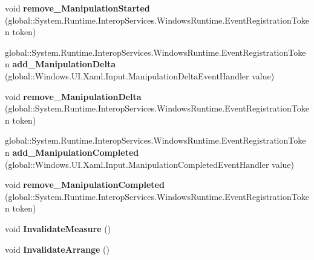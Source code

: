 \begin{DoxyCompactItemize}
void {\bfseries remove\+\_\+\+Manipulation\+Started} (global\+::\+System.\+Runtime.\+Interop\+Services.\+Windows\+Runtime.\+Event\+Registration\+Token token)
\item 
\mbox{\label{interface_windows_1_1_u_i_1_1_xaml_1_1_i_u_i_element_a478e7f65d80dfe362a865349005a2475}} 
global\+::\+System.\+Runtime.\+Interop\+Services.\+Windows\+Runtime.\+Event\+Registration\+Token {\bfseries add\+\_\+\+Manipulation\+Delta} (global\+::\+Windows.\+U\+I.\+Xaml.\+Input.\+Manipulation\+Delta\+Event\+Handler value)
\item 
\mbox{\label{interface_windows_1_1_u_i_1_1_xaml_1_1_i_u_i_element_a6abde84051b66829e30ea77484453f4f}} 
void {\bfseries remove\+\_\+\+Manipulation\+Delta} (global\+::\+System.\+Runtime.\+Interop\+Services.\+Windows\+Runtime.\+Event\+Registration\+Token token)
\item 
\mbox{\label{interface_windows_1_1_u_i_1_1_xaml_1_1_i_u_i_element_a359638bee7a6419a6b037cbd2981ae94}} 
global\+::\+System.\+Runtime.\+Interop\+Services.\+Windows\+Runtime.\+Event\+Registration\+Token {\bfseries add\+\_\+\+Manipulation\+Completed} (global\+::\+Windows.\+U\+I.\+Xaml.\+Input.\+Manipulation\+Completed\+Event\+Handler value)
\item 
\mbox{\label{interface_windows_1_1_u_i_1_1_xaml_1_1_i_u_i_element_a2e0443d9216898f5abc1ba06ac3d0404}} 
void {\bfseries remove\+\_\+\+Manipulation\+Completed} (global\+::\+System.\+Runtime.\+Interop\+Services.\+Windows\+Runtime.\+Event\+Registration\+Token token)
\item 
\mbox{\label{interface_windows_1_1_u_i_1_1_xaml_1_1_i_u_i_element_aac9b9aec43687960735502a35820466d}} 
void {\bfseries Invalidate\+Measure} ()
\item 
\mbox{\label{interface_windows_1_1_u_i_1_1_xaml_1_1_i_u_i_element_aac9b7aa8b7e9841562d377013cf574d7}} 
void {\bfseries Invalidate\+Arrange} ()
\item 
\mbox{\label{interface_windows_1_1_u_i_1_1_xaml_1_1_i_u_i_element_af7acd3e9383678b8386d4a908b7037ea}} 

\end{DoxyCompactItemize}
